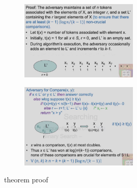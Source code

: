 \begin{figure}[H]
    \centering
    \begin{subfigure}{0.48\textwidth}
        \centering
        \includegraphics[width=0.618\textwidth]{pic/DAA3/theoremproof1}
    \end{subfigure}
    \begin{subfigure}{0.48\textwidth}
        \centering
        \includegraphics[width=0.618\textwidth]{pic/DAA3/theoremproof2}
    \end{subfigure}
    \caption{theorem proof}
\end{figure}

